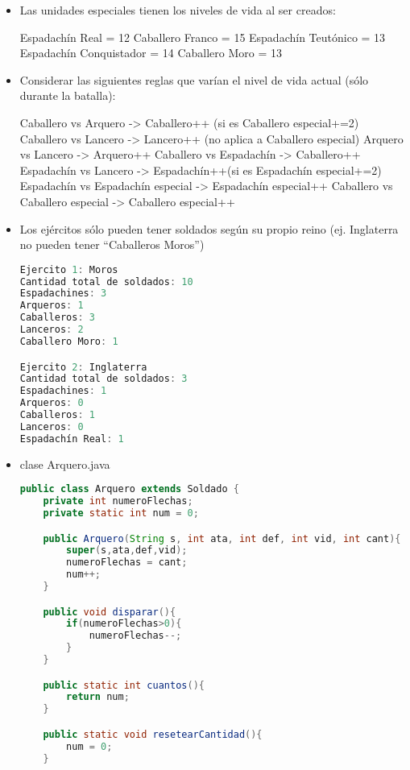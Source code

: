 \documentclass{article}
\begin{document}
\begin{itemize}
        \item Las unidades especiales tienen los niveles de vida al ser creados:

        \subitem Espadachín Real = 12
        \subitem Caballero Franco = 15
        \subitem Espadachín Teutónico = 13
        \subitem Espadachín Conquistador = 14
        \subitem Caballero Moro = 13
        
        \item Considerar las siguientes reglas que varían el nivel de vida actual (sólo durante la batalla):

        \subitem Caballero vs Arquero -> Caballero++ (si es Caballero especial+=2)
        \subitem Caballero vs Lancero -> Lancero++ (no aplica a Caballero especial)
        \subitem Arquero vs Lancero -> Arquero++
        \subitem Caballero vs Espadachín -> Caballero++
        \subitem Espadachín vs Lancero -> Espadachín++(si es Espadachín especial+=2)
        \subitem Espadachín vs Espadachín especial -> Espadachín especial++
        \subitem Caballero vs Caballero especial -> Caballero especial++

        \item Los ejércitos sólo pueden tener soldados según su propio reino (ej. Inglaterra no pueden tener “Caballeros Moros”)

        \begin{lstlisting}[language=java]
Ejercito 1: Moros
Cantidad total de soldados: 10
Espadachines: 3
Arqueros: 1
Caballeros: 3
Lanceros: 2
Caballero Moro: 1

Ejercito 2: Inglaterra
Cantidad total de soldados: 3
Espadachines: 1
Arqueros: 0
Caballeros: 1
Lanceros: 0
Espadachín Real: 1
        \end{lstlisting}

        \item clase Arquero.java
        \begin{lstlisting}[language=java]
public class Arquero extends Soldado {
    private int numeroFlechas;
    private static int num = 0;

    public Arquero(String s, int ata, int def, int vid, int cant){
        super(s,ata,def,vid);
        numeroFlechas = cant;
        num++;
    }

    public void disparar(){
        if(numeroFlechas>0){
            numeroFlechas--;
        }
    }

    public static int cuantos(){
        return num;
    }

    public static void resetearCantidad(){
        num = 0;
    }
    

\end{lstlisting}
\end{itemize}
\end{document}
